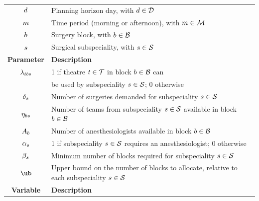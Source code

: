 \documentclass[review,3p,authoryear]{elsarticle}
\begin{document}
\begin{table}
\begin{tabular}{cl}
        $d$                 & Planning horizon day, with $d \in \mathcal{D}$ \\
        $m$                      & Time period (morning or afternoon), with $m \in \mathcal{M}$           \\
        $b$                           & Surgery block, with $b \in \mathcal{B}$                                    \\
        $s$                       & Surgical subspeciality, with $s \in \mathcal{S}$                      \\
    \midrule
    \textbf{Parameter}                        & \textbf{Description}                                                                  \\
    \midrule
        $\lambda_{tbs}$   & 1 if theatre $t \in \mathcal{T}$ in block $b \in \mathcal{B}$ can              \\
                                                           & be used by subspeciality $s \in \mathcal{S}$; 0 otherwise          \\
        $\delta_{s}$                          & Number of surgeries demanded for subspeciality $s \in \mathcal{S}$                       \\
        $\eta_{bs}$              & Number of teams from subspeciality $s \in \mathcal{S}$ available in block  $b \in \mathcal{B}$ \\
        $A_{b}$                       & Number of anesthesiologists available in block $b \in \mathcal{B}$                         \\
        $\alpha_{s}$                       & 1 if subspeciality $s \in \mathcal{S}$ requires an anesthesiologist; 0 otherwise         \\    
        $\beta_{s}$                      & Minimum number of blocks required for subspeciality $s \in \mathcal{S}$            \\
        $\ub$                                              & Upper bound on the number of blocks to allocate, relative to each subspeciality $s \in \mathcal{S}$   \\
    \bottomrule
    \textbf{Variable}                         & \textbf{Description}                                                                  \\

\end{tabular}
\end{table}
\end{document}
